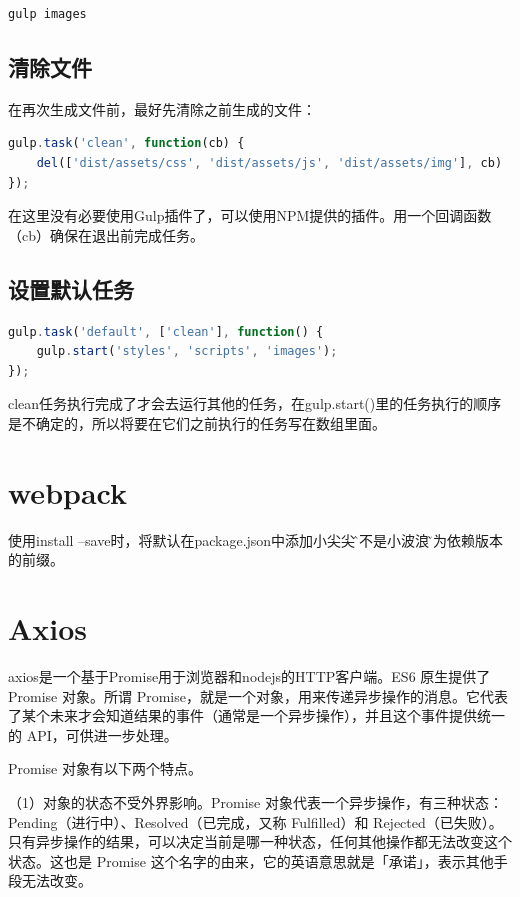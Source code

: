 \documentclass[letter]{book}
\begin{document}
\begin{lstlisting}[language=Bash]
gulp images
\end{lstlisting}

\subsection{清除文件}

在再次生成文件前，最好先清除之前生成的文件：

\begin{lstlisting}[language=JavaScript]
gulp.task('clean', function(cb) {
	del(['dist/assets/css', 'dist/assets/js', 'dist/assets/img'], cb)
});
\end{lstlisting}

在这里没有必要使用Gulp插件了，可以使用NPM提供的插件。用一个回调函数（cb）确保在退出前完成任务。

\subsection{设置默认任务}

\begin{lstlisting}[language=JavaScript]
gulp.task('default', ['clean'], function() {
	gulp.start('styles', 'scripts', 'images');
});
\end{lstlisting}

clean任务执行完成了才会去运行其他的任务，在gulp.start()里的任务执行的顺序是不确定的，所以将要在它们之前执行的任务写在数组里面。

\section{webpack}

使用install --save时，将默认在package.json中添加小尖尖\^而不是小波浪\~作为依赖版本的前缀。


\section{Axios}

axios是一个基于Promise用于浏览器和nodejs的HTTP客户端。ES6 原生提供了 Promise 对象。所谓 Promise，就是一个对象，用来传递异步操作的消息。它代表了某个未来才会知道结果的事件（通常是一个异步操作），并且这个事件提供统一的 API，可供进一步处理。

Promise 对象有以下两个特点。

（1）对象的状态不受外界影响。Promise 对象代表一个异步操作，有三种状态：Pending（进行中）、Resolved（已完成，又称 Fulfilled）和 Rejected（已失败）。只有异步操作的结果，可以决定当前是哪一种状态，任何其他操作都无法改变这个状态。这也是 Promise 这个名字的由来，它的英语意思就是「承诺」，表示其他手段无法改变。
\end{document}
